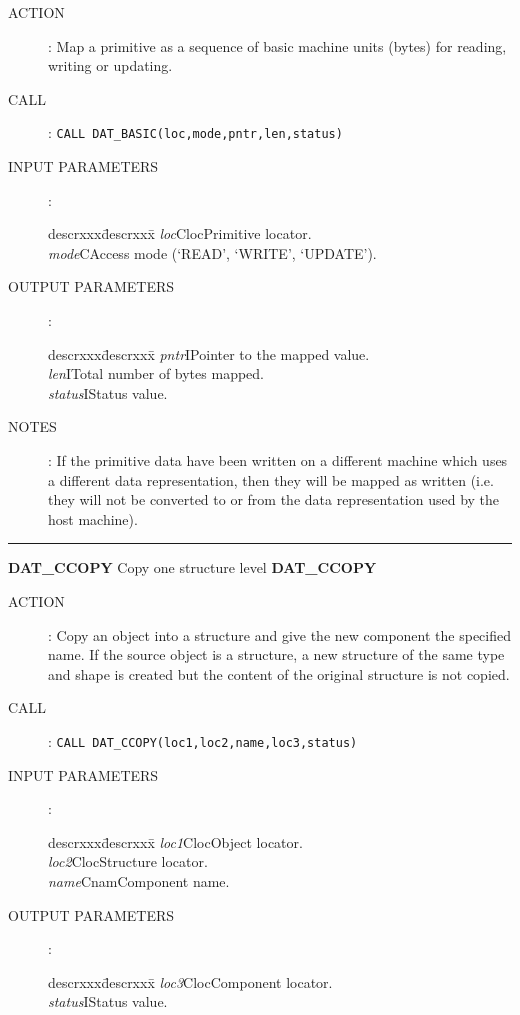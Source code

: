 \begin{description}
\item [ACTION]:
Map a primitive as a sequence of basic machine units (bytes) for
reading, writing or updating.
\item [CALL]:
{\tt CALL DAT\_BASIC(loc,mode,pntr,len,status)}
\item [INPUT PARAMETERS]:
\begin{tabbing}
descrxxx\=descrxxx\=\kill
{\em loc}\>Cloc\>Primitive locator.\\
{\em mode}\>C\>Access mode (`READ', `WRITE', `UPDATE').
\end{tabbing}
\item [OUTPUT PARAMETERS]:
\begin{tabbing}
descrxxx\=descrxxx\=\kill
{\em pntr}\>I\>Pointer to the mapped value.\\
{\em len}\>I\>Total number of bytes mapped.\\
{\em status}\>I\>Status value.
\end{tabbing}
\item [NOTES]:
If the primitive data have been written on a different machine which uses a
different data representation, then they will be mapped as written (i.e. they
will not be converted to or from the data representation used by the host
machine).
\end{description}
\goodbreak
\rule{\textwidth}{0.3mm}
{\Large {\bf DAT\_CCOPY} \hfill Copy one structure level \hfill {\bf DAT\_CCOPY}}
\begin{description}
\item [ACTION]:
Copy an object into a structure and give the new component the specified name.
If the source object is a structure, a new structure of the same type and shape
is created but the content of the original structure is not copied.
\item [CALL]:
{\tt CALL DAT\_CCOPY(loc1,loc2,name,loc3,status)}
\item [INPUT PARAMETERS]:
\begin{tabbing}
descrxxx\=descrxxx\=\kill
{\em loc1}\>Cloc\>Object locator.\\
{\em loc2}\>Cloc\>Structure locator.\\
{\em name}\>Cnam\>Component name.
\end{tabbing}
\item [OUTPUT PARAMETERS]:
\begin{tabbing}
descrxxx\=descrxxx\=\kill
{\em loc3}\>Cloc\>Component locator.\\
{\em status}\>I\>Status value.
\end{tabbing}
\end{description}
